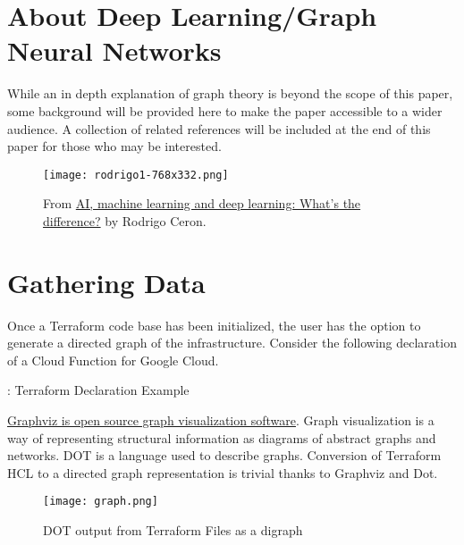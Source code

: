 



\vspace{2mm}

\vspace{2mm}

\section{\label{sec:Graph}About Deep Learning/Graph Neural Networks}

\justifying
While an in depth explanation of graph theory is beyond the scope of this paper, some background
will be provided here to make the paper accessible to a wider audience. A collection of related references
will be included at the end of this paper for those who may be interested.

\begin{figure}[H]
    \texttt{[image: rodrigo1-768x332.png]}
    \caption{From \href{https://www.ibm.com/blogs/systems/ai-machine-learning-and-deep-learning-whats-the-difference/}{AI, machine learning and deep learning: What’s the difference?} by Rodrigo Ceron.}
    \label{aimldl}
\end{figure}

\section{\label{sec:collection}Gathering Data}

\justifying
Once a Terraform code base has been initialized, the user has the option to generate a directed graph of the infrastructure. Consider the following declaration of a Cloud Function for Google Cloud.

\begin{mybox}{\thetcbcounter: Terraform Declaration Example}
    
\end{mybox}

\justifying
\href{https://graphviz.org/}{Graphviz is open source graph visualization software}. Graph visualization is a way of representing
structural information as diagrams of abstract graphs and networks. DOT is a language used to describe graphs. Conversion of
Terraform HCL to a directed graph representation is trivial thanks to Graphviz and Dot.

\justifying
\begin{figure}[H]
	\texttt{[image: graph.png]}
	\caption{DOT output from Terraform Files as a digraph}
	\label{pygraph}
\end{figure}


